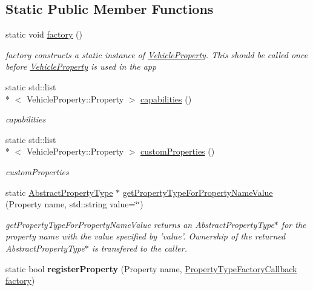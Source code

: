 \subsection*{Static Public Member Functions}
\begin{DoxyCompactItemize}
\item 
\hypertarget{classVehicleProperty_a528c8e2ee75036f6e50c0121f4184fa2}{static void \hyperlink{classVehicleProperty_a528c8e2ee75036f6e50c0121f4184fa2}{factory} ()}\label{classVehicleProperty_a528c8e2ee75036f6e50c0121f4184fa2}

\begin{DoxyCompactList}\small\item\em factory constructs a static instance of \hyperlink{classVehicleProperty}{Vehicle\-Property}. This should be called once before \hyperlink{classVehicleProperty}{Vehicle\-Property} is used in the app \end{DoxyCompactList}\item 
static std\-::list\\*
$<$ Vehicle\-Property\-::\-Property $>$ \hyperlink{classVehicleProperty_aa238272767b6b4101b9bef14bf09631b}{capabilities} ()
\begin{DoxyCompactList}\small\item\em capabilities \end{DoxyCompactList}\item 
static std\-::list\\*
$<$ Vehicle\-Property\-::\-Property $>$ \hyperlink{classVehicleProperty_a5a9afad3f68db690652b80cfccdffc66}{custom\-Properties} ()
\begin{DoxyCompactList}\small\item\em custom\-Properties \end{DoxyCompactList}\item 
\hypertarget{classVehicleProperty_a60e654875a0d5901af8ab2d3dc596472}{static \hyperlink{classAbstractPropertyType}{Abstract\-Property\-Type} $\ast$ \hyperlink{classVehicleProperty_a60e654875a0d5901af8ab2d3dc596472}{get\-Property\-Type\-For\-Property\-Name\-Value} (Property name, std\-::string value=\char`\"{}\char`\"{})}\label{classVehicleProperty_a60e654875a0d5901af8ab2d3dc596472}

\begin{DoxyCompactList}\small\item\em get\-Property\-Type\-For\-Property\-Name\-Value returns an Abstract\-Property\-Type$\ast$ for the property name with the value specified by 'value'. Ownership of the returned Abstract\-Property\-Type$\ast$ is transfered to the caller. \end{DoxyCompactList}\item 
\hypertarget{classVehicleProperty_aec55cb2758688c0e92dc53f67b320208}{static bool {\bfseries register\-Property} (Property name, \hyperlink{classVehicleProperty_a6fdd075ce5b867b571020fcdc723ddcf}{Property\-Type\-Factory\-Callback} \hyperlink{classVehicleProperty_a528c8e2ee75036f6e50c0121f4184fa2}{factory})}\label{classVehicleProperty_aec55cb2758688c0e92dc53f67b320208}

\end{DoxyCompactItemize}
